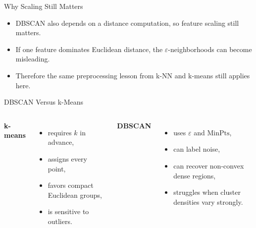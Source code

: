 \begin{frame}{Why Scaling Still Matters}
\begin{itemize}
  \item DBSCAN also depends on a distance computation, so feature scaling still matters.
  \pause
  \item If one feature dominates Euclidean distance, the $\varepsilon$-neighborhoods can become misleading.
  \pause
  \item Therefore the same preprocessing lesson from k-NN and k-means still applies here.
\end{itemize}
\end{frame}

\begin{frame}{DBSCAN Versus k-Means}
\begin{columns}[T]
\textbf{k-means}
\begin{itemize}
  \item requires $k$ in advance,
  \pause
  \item assigns every point,
  \pause
  \item favors compact Euclidean groups,
  \pause
  \item is sensitive to outliers.
\end{itemize}

\pause
{}
\textbf{DBSCAN}
\begin{itemize}
  \item uses $\varepsilon$ and $\text{MinPts}$,
  \pause
  \item can label noise,
  \pause
  \item can recover non-convex dense regions,
  \pause
  \item struggles when cluster densities vary strongly.
\end{itemize}
\end{columns}
\end{frame}

